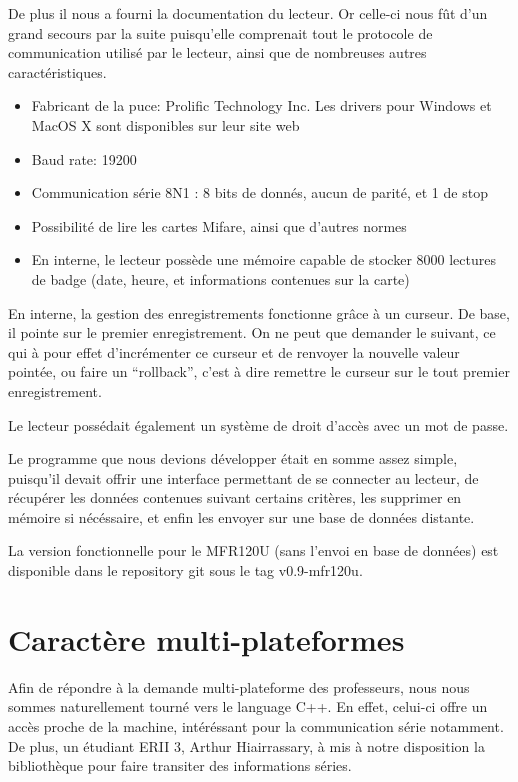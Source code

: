 De plus il nous a fourni la documentation du lecteur. Or celle-ci nous fût d'un
grand secours par la suite puisqu'elle comprenait tout le protocole de communication
utilisé par le lecteur, ainsi que de nombreuses autres caractéristiques.

    \begin{itemize}
    \item Fabricant de la puce: Prolific Technology Inc. Les drivers pour Windows
          et MacOS X sont disponibles sur leur site web \cite{prolific}
    \item Baud rate: 19200
    \item Communication série 8N1 : 8 bits de donnés, aucun de parité, et 1 de stop
    \item Possibilité de lire les cartes Mifare, ainsi que d'autres normes
    \item En interne, le lecteur possède une mémoire capable de stocker 8000
          lectures de badge (date, heure, et informations contenues sur la carte)
    \end{itemize}

En interne, la gestion des enregistrements fonctionne grâce à un curseur.
De base, il pointe sur le premier enregistrement. On ne peut que demander le suivant,
ce qui à pour effet d'incrémenter ce curseur et de renvoyer la nouvelle valeur
pointée, ou faire un ``rollback'', c'est à dire remettre le curseur sur le tout
premier enregistrement.

Le lecteur possédait également un système de droit d'accès avec un mot de passe.

Le programme que nous devions développer était en somme assez simple, puisqu'il
devait offrir une interface permettant de se connecter au lecteur, de récupérer les
données contenues suivant certains critères, les supprimer en mémoire si nécéssaire,
et enfin les envoyer sur une base de données distante.

La version fonctionnelle pour le MFR120U (sans l'envoi en base de données)
est disponible dans le repository git sous le tag v0.9-mfr120u.


    \section{Caractère multi-plateformes}
Afin de répondre à la demande multi-plateforme des professeurs, nous nous 
sommes naturellement tourné vers le language C++. En effet, celui-ci offre un accès
proche de la machine, intéréssant pour la communication série notamment. De plus,
un étudiant ERII 3, Arthur Hiairrassary, à mis à notre disposition la bibliothèque
pour faire transiter des informations séries.

